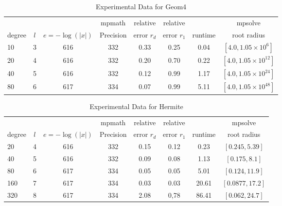 \documentclass[sigconf]{acmart}
\begin{document}
\begin{table}[t]
\caption{Experimental Data for Geom4}
\label{tab:geom4}
\vskip 0.15in
\begin{center}
\begin{small}
\begin{sc}
\begin{tabular}{lccccccc}
\toprule
&  &  & mpmath & relative  & relative &  & mpsolve \\
degree  & $l$& $e=-\log(|x|)$& Precision &error $r_d$       & error $r_1$ &runtime& root radius\\
\midrule
   10 & 3 & 616 & 332 & 0.33 & 0.25 & 0.04 & $[4.0, 1.05 \times 10^6]$ \\
   20 & 4 & 616 & 332 & 0.20 & 0.70 & 0.22 & $[4.0, 1.05 \times 10^12]$ \\
   40 & 5 & 616 & 332 & 0.12 & 0.99 & 1.17 & $[4.0, 1.05 \times 10^24]$ \\
   80 & 6 & 617 & 334 & 0.07 & 0.99 & 5.11 & $[4.0, 1.05 \times 10^48]$ \\
\bottomrule
\end{tabular}
\end{sc}
\end{small}
\end{center}
\vskip -0.1in
\end{table}

\begin{table}[t]
\caption{Experimental Data for Hermite}
\label{tab:hermite}
\vskip 0.15in
\begin{center}
\begin{small}
\begin{sc}
\begin{tabular}{lccccccc}
\toprule
&  &  & mpmath & relative  & relative &  & mpsolve \\
degree  & $l$& $e=-\log(|x|)$& Precision &error $r_d$       & error $r_1$ &runtime& root radius\\
\midrule
   20 & 4 & 616 & 332 & 0.15 & 0.12 & 0.23 & $[0.245,5.39]$ \\
   40 & 5 & 616 & 332 & 0.09 & 0.08 & 1.13 & $[0.175,8.1]$\\
   80 & 6 & 617 & 334 & 0.05 & 0.05 & 5.01 & $[0.124,11.9]$\\
 160 & 7 & 617 & 334 & 0.03 & 0.03 & 20.61 & $[0.0877,17.2]$\\
 320 & 8 & 617 & 334 & 2.08 & 0,78 & 86.41 & $[0.062,24.7]$\\
\bottomrule
\end{tabular}
\end{sc}
\end{small}
\end{center}
\vskip -0.1in
\end{table}
\end{document}

